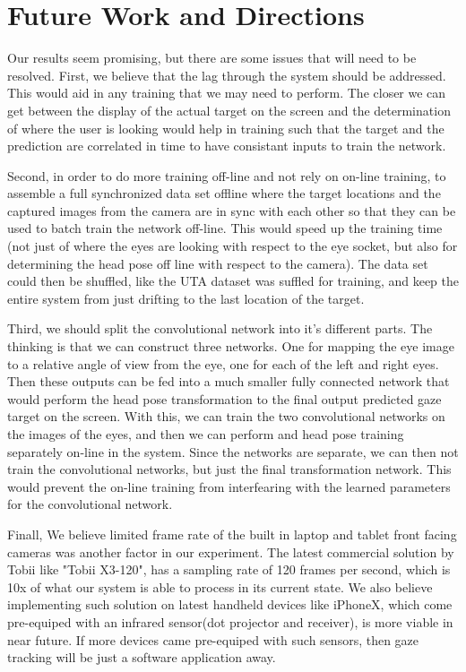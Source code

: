 \documentclass[10pt,twocolumn,letterpaper]{article}
\begin{document}
\section{Future Work and Directions}
Our results seem promising, but there are some issues that will need
to be resolved. First, we believe that the lag through the system
should be addressed. This would aid in any training that we may need
to perform. The closer we can get between the display of the actual
target on the screen and the determination of where the user is
looking would help in training such that the target and the prediction
are correlated in time to have consistant inputs to train the
network.

Second, in order to do more training off-line and not rely on on-line
training, to assemble a full synchronized data set offline where the
target locations and the captured images from the camera are in sync
with each other so that they can be used to batch train the network
off-line. This would speed up the training time (not just of where the
eyes are looking with respect to the eye socket, but also for
determining the head pose off line with respect to the camera). The
data set could then be shuffled, like the UTA dataset was suffled for
training, and keep the entire system from just drifting to the last
location of the target.

Third, we should split the convolutional network into it's different
parts. The thinking is that we can construct three networks. One for
mapping the eye image to a relative angle of view from the eye, one
for each of the left and right eyes. Then these outputs can be fed
into a much smaller fully connected network that would perform the
head pose transformation to the final output predicted gaze target on
the screen. With this, we can train the two convolutional networks on
the images of the eyes, and then we can perform and head pose training
separately on-line in the system. Since the networks are separate, we
can then not train the convolutional networks, but just the final
transformation network. This would prevent the on-line training from
interfearing with the learned parameters for the convolutional network.

Finall, We believe limited frame rate of the built in laptop and tablet front facing cameras was another 
factor in our experiment. The latest commercial solution by Tobii like "Tobii X3-120", has a sampling 
rate of 120 frames per second, which is 10x of what our system is able to process in its current state. 
We also believe implementing such solution on latest handheld devices like iPhoneX, which 
come pre-equiped with an infrared sensor(dot projector and receiver), is more viable in near future. 
If more devices came pre-equiped with such sensors, then gaze tracking will be just a software application away. 
\end{document}
